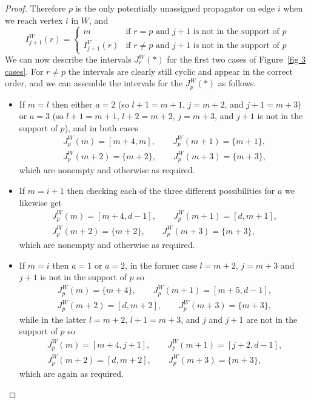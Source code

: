 \documentclass[11pt]{article}
\theoremstyle{remark}
\theoremstyle{definition}
\begin{document}
\begin{proof}
Therefore $p$ is the only potentially unassigned propagator on edge $i$ when we reach vertex $i$ in $W$, and
    \[
    I_{j+1}^{W}(r)  = \begin{cases}
      m & \text{if  $r=p$ and $j+1$ is not in the support of $p$}\\
      I_{j+1}^{V}(r) & \text{if  $r\neq p$ and $j+1$ is not in the support of $p$}
    \end{cases}
    \]
We can now describe the intervals $J^{W}_r(*)$ for the first two cases of Figure~\ref{fig 3 cases}. For $r \neq p$ the intervals are clearly still cyclic and appear in the correct order, and we can assemble the intervals for the $J_p^{W}(*)$ as follows.
    \begin{itemize}
      \item 
    If $m=l$ then either $a=2$ (so $l+1=m+1$, $j=m+2$, and $j+1=m+3$) or $a=3$ (so $l+1=m+1$, $l+2=m+2$, $j=m+3$, and $j+1$ is not in the support of $p$), and in both cases
    \begin{gather*}
    J^{W}_p(m) = [m+4, m], \qquad  J^{W}_p(m+1) = \{m+1\}, \\ J^{W}_p(m+2) = \{m+2\}, \qquad  J^{W}_p(m+3) = \{m+3\},
    \end{gather*}
    which are nonempty and otherwise as required.
  \item
        If $m=i+1$ then checking each of the three different possibilities for $a$ we likewise get
    \begin{gather*}
    J^{W}_p(m) = [m+4, d-1], \qquad  J^{W}_p(m+1) = [d, m+1], \\  J^{W}_p(m+2) = \{m+2\}, \qquad  J^{W}_p(m+3) = \{m+3\},
    \end{gather*}
    which are nonempty and otherwise as required.
  \item If $m=i$ then $a=1$ or $a=2$, in the former case $l=m+2$, $j=m+3$ and $j+1$ is not in the support of $p$ so
    \begin{gather*}
    J^{W}_p(m) = \{m+4\}, \qquad  J^{W}_p(m+1) = [m+5, d-1], \\  J^{W}_p(m+2) = [d, m+2], \qquad  J^{W}_p(m+3) = \{m+3\},
    \end{gather*}
    while in the latter $l=m+2$, $l+1=m+3$, and $j$ and $j+1$ are not in the support of $p$ so
    \begin{gather*}
    J^{W}_p(m) = [m+4, j+1], \qquad  J^{W}_p(m+1) = [j+2, d-1], \\  J^{W}_p(m+2) = [d, m+2], \qquad  J^{W}_p(m+3) = \{m+3\},
    \end{gather*}
    which are again as required.
    \end{itemize}


\end{proof}
\end{document}

